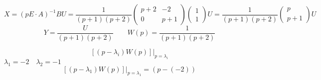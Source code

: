 \bigskip
\[
  X = (pE \cdot A)^{-1}BU = \frac{1}{(p+1)(p+2)}\begin{pmatrix} p+2 & -2 \\ 0 &
  p+1 \end{pmatrix} \begin{pmatrix} 1 \\ 1 \end{pmatrix} U =
  \frac{1}{(p+1)(p+2)} \begin{pmatrix} p \\ p+1 \end{pmatrix} U
\] 
\bigskip
\[
Y = \frac{U}{(p+1)(p+2)} \qquad W(p) = \frac{1}{(p+1)(p+2)}
\] 
\centerline{\hfill\hrulefill\hrulefill\hrulefill\hfill}
\bigskip
\[ [(p - \lambda_i)W(p)]|_{p =\lambda_i} \] 
$\lambda_1 = -2 \quad \lambda_2 = -1$
\[ [(p - \lambda_1)W(p)]|_{p=\lambda_1} = (p - (-2)) \] 


